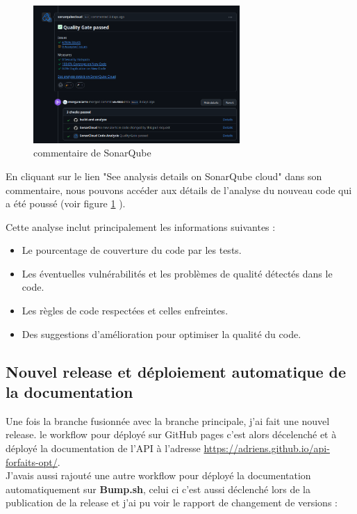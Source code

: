 \documentclass{article}
\begin{document}
		\begin{figure}[H] \centering \includegraphics[width=0.7\textwidth]{asset/sonarq_com.png} \caption{commentaire de SonarQube} \label{fig:sonarq}\end{figure}
	
	En cliquant sur le lien "See analysis details on SonarQube cloud" dans son commentaire, nous pouvons accéder aux détails de l'analyse du nouveau code qui a été poussé (voir figure \ref{fig:sonarq} ). 
	
	Cette analyse inclut principalement les informations suivantes : \begin{itemize} \item Le pourcentage de couverture du code par les tests. \item Les éventuelles vulnérabilités et les problèmes de qualité détectés dans le code. \item Les règles de code respectées et celles enfreintes. \item Des suggestions d'amélioration pour optimiser la qualité du code. \end{itemize}
	
	\subsection{Nouvel release et déploiement automatique de la documentation}
	
	Une fois la branche fusionnée avec la branche principale, j'ai fait une nouvel release. le workflow pour déployé sur GitHub pages c'est alors décelenché et à déployé la documentation de l'API à l'adresse \url{https://adriens.github.io/api-forfaits-opt/}.\\
	J'avais aussi rajouté une autre workflow pour déployé la documentation  automatiquement sur \textbf{Bump.sh}, celui ci c'est aussi déclenché lors de la publication de la release et j'ai pu voir le rapport de changement de versions : 
	
\end{document}
